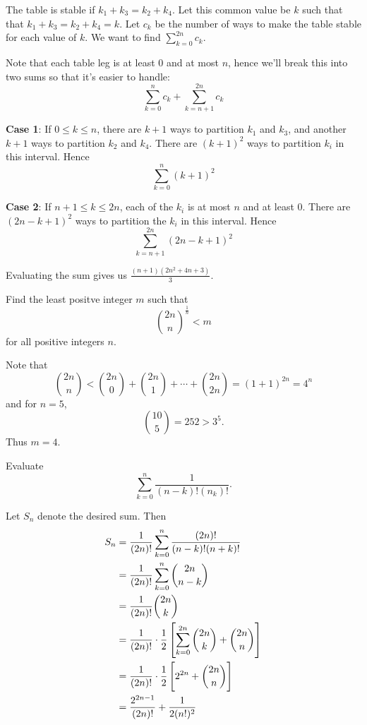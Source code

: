 \begin{solution}
The table is stable if $k_1+k_3=k_2+k_4$. Let this common value be $k$ such that that $k_1+k_3=k_2+k_4=k$. Let $c_k$ be the number of ways to make the table stable for each value of $k$. We want to find $\sum_{k=0}^{2n}c_k$.

Note that each table leg is at least 0 and at most $n$, hence we'll break this into two sums so that it's easier to handle:
\[\sum_{k=0}^n c_k+\sum_{k=n+1}^{2n}c_k\]

\textbf{Case 1}: If $0\le k\le n$, there are $k+1$ ways to partition $k_1$ and $k_3$, and another $k+1$ ways to partition $k_2$ and $k_4$. There are $(k+1)^2$ ways to partition $k_i$ in this interval. Hence 
\[\sum_{k=0}^n (k+1)^2\]

\textbf{Case 2}: If $n+1\le k\le 2n$, each of the $k_i$ is at most $n$ and at least $0$. There are $(2n-k+1)^2$ ways to partition the $k_i$ in this interval. Hence
\[\sum_{k=n+1}^{2n}(2n-k+1)^2\]

Evaluating the sum gives us $\boxed{\frac{(n+1)(2n^2+4n+3)}{3}}$.
\end{solution}
\pagebreak

\begin{prbm}[ROMANIA 1990]
Find the least positve integer $m$ such that
\[ \binom{2n}{n}^\frac{1}{n}<m \]
for all positive integers $n$.
\end{prbm}

\begin{solution}
Note that
\[ \binom{2n}{n}<\binom{2n}{0}+\binom{2n}{1}+\cdots+\binom{2n}{2n}=(1+1)^{2n}=4^n \]
and for $n=5$,
\[ \binom{10}{5}=252>3^5. \]
Thus $m=4$.
\end{solution}
\pagebreak

\begin{prbm}
Evaluate
\[ \sum_{k=0}^n\frac{1}{(n-k)!(n_k)!}. \]
\end{prbm}

\begin{solution}
Let $S_n$ denote the desired sum. Then
\begin{align*}
S_n&=\frac{1}{(2n)!}\sum_{k=0}^n\frac{(2n)!}{(n-k)!(n+k)!}\\
&=\frac{1}{(2n)!}\sum_{k=0}^n\binom{2n}{n-k}\\
&=\frac{1}{(2n)!}\binom{2n}{k}\\
&=\frac{1}{(2n)!}\cdot\frac{1}{2}\left[\sum_{k=0}^{2n}\binom{2n}{k}+\binom{2n}{n}\right]\\
&=\frac{1}{(2n)!}\cdot\frac{1}{2}\left[2^{2n}+\binom{2n}{n}\right]\\
&=\frac{2^{2n-1}}{(2n)!}+\frac{1}{2(n!)^2}
\end{align*}
\end{solution}

